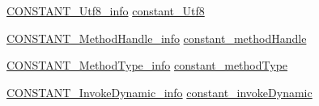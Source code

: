 \begin{DoxyCompactItemize}
\item 
\hyperlink{structs_8hpp_a2c99a23a5dec8fe5e86498bb0fc1a18d}{C\+O\+N\+S\+T\+A\+N\+T\+\_\+\+Utf8\+\_\+info} \hyperlink{unioncp__info__u_a0a674b77186bea6da5c1f1311ba1b594}{constant\+\_\+\+Utf8}
\item 
\hyperlink{structs_8hpp_a863e6b2ab8603c43c0072809b41adf0c}{C\+O\+N\+S\+T\+A\+N\+T\+\_\+\+Method\+Handle\+\_\+info} \hyperlink{unioncp__info__u_afc136c55fd02b88bb21a5aae24514025}{constant\+\_\+method\+Handle}
\item 
\hyperlink{structs_8hpp_a8885b4c01b5d7217e80864ad1019696a}{C\+O\+N\+S\+T\+A\+N\+T\+\_\+\+Method\+Type\+\_\+info} \hyperlink{unioncp__info__u_ae7a8f3a0c5a809fe6342411d8908e615}{constant\+\_\+method\+Type}
\item 
\hyperlink{structs_8hpp_a2537ef8ea7dec99c077fd6a3c3c619ff}{C\+O\+N\+S\+T\+A\+N\+T\+\_\+\+Invoke\+Dynamic\+\_\+info} \hyperlink{unioncp__info__u_ac0f54cc7ccab5abb2eb1a89410cf1936}{constant\+\_\+invoke\+Dynamic}
\end{DoxyCompactItemize}


